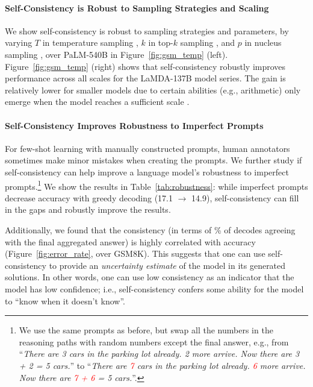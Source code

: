 \paragraph{Self-Consistency is Robust to Sampling Strategies and Scaling} We show self-consistency is robust to sampling strategies and parameters, by varying $T$ in temperature sampling \citep{ACKLEY1985147,ficler-goldberg-2017-controlling}, $k$ in top-$k$ sampling \citep{fan-etal-2018-hierarchical,holtzman-etal-2018-learning,Radford2019LanguageMA}, and $p$ in nucleus sampling \citep{nucleus_sampling}, over PaLM-540B in Figure~\ref{fig:gsm_temp} (left).
Figure~\ref{fig:gsm_temp} (right) shows that self-consistency robustly improves performance across all scales for the LaMDA-137B model series. The gain is relatively lower for smaller models due to certain abilities (e.g., arithmetic) only emerge when the model reaches a sufficient scale \citep{brown2020language}.

\paragraph{Self-Consistency Improves Robustness to Imperfect Prompts} For few-shot learning with manually constructed prompts, human annotators sometimes make minor mistakes when creating the prompts. We further study if self-consistency can help improve a language model's robustness to imperfect prompts.\footnote{We use the same prompts as before, but swap all the numbers in the reasoning paths with random numbers except the final answer, e.g., from ``\textit{There are 3 cars in the parking lot already. 2 more arrive. Now there are 3 + 2 = 5 cars.}'' to ``\textit{There are \textcolor{red}{7} cars in the parking lot already. \textcolor{red}{6} more arrive. Now there are \textcolor{red}{7 + 6} = 5 cars.}''.} We show the results in Table~\ref{tab:robustness}: while imperfect prompts decrease accuracy with greedy decoding (17.1 $\rightarrow$ 14.9), self-consistency can fill in the gaps and robustly improve the results.

Additionally, we found that the consistency (in terms of \% of decodes agreeing with the final aggregated answer) is highly correlated with accuracy (Figure~\ref{fig:error_rate}, over GSM8K). This suggests that one can use self-consistency to provide an \textit{uncertainty estimate} of the model in its generated solutions.  In other words, one can use low consistency as an indicator that the model has low confidence; i.e., self-consistency confers some ability for the model to ``know when it doesn't know''.

